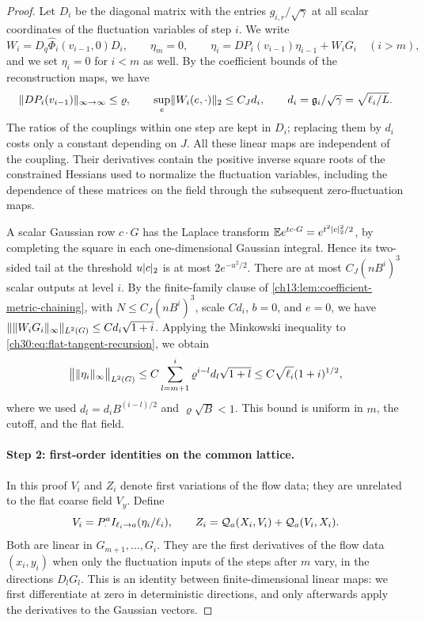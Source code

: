 \begin{proof}
Let $D_i$ be the diagonal matrix with the entries $g_{i,r}/\sqrt\gamma$ at all scalar coordinates of the fluctuation variables of step $i$. We write
\begin{equation}\label{ch30:eq:flat-tangent-recursion}
 W_i=D_q\widehat\Phi_i(v_{i-1},0)D_i,\qquad\eta_m=0,\qquad\eta_i=DP_i(v_{i-1})\eta_{i-1}+W_iG_i\quad(i>m),
\end{equation}
and we set $\eta_i=0$ for $i<m$ as well. By the coefficient bounds of the reconstruction maps, we have
\[
 \lVert DP_i(v_{i-1})\rVert_{\infty\to\infty}\le\varrho,\qquad\sup_e\lVert W_i(e,\cdot)\rVert_2\le C_Jd_i,\qquad d_i=\mathfrak g_i/\sqrt\gamma=\sqrt{\ell_i/L}.
\]
The ratios of the couplings within one step are kept in $D_i$; replacing them by $d_i$ costs only a constant depending on $J$. All these linear maps are independent of the coupling. Their derivatives contain the positive inverse square roots of the constrained Hessians used to normalize the fluctuation variables, including the dependence of these matrices on the field through the subsequent zero-fluctuation maps.

A scalar Gaussian row $c\cdot G$ has the Laplace transform $\mathbb E e^{tc\cdot G}=e^{t^2\lvert c\rvert_2^2/2}$, by completing the square in each one-dimensional Gaussian integral. Hence its two-sided tail at the threshold $u\lvert c\rvert_2$ is at most $2e^{-u^2/2}$. There are at most $C_J(nB^i)^3$ scalar outputs at level $i$. By the finite-family clause of \cref{ch13:lem:coefficient-metric-chaining}, with $N\le C_J(nB^i)^3$, scale $Cd_i$, $b=0$, and $e=0$, we have $\lVert \lVert W_iG_i\rVert_\infty\rVert_{L^2(G)}\le Cd_i\sqrt{1+i}$. Applying the Minkowski inequality to \eqref{ch30:eq:flat-tangent-recursion}, we obtain
\begin{equation}\label{ch30:eq:flat-linear-field}
 \bigl\lVert\lVert \eta_i\rVert_\infty\bigr\rVert_{L^2(G)}\le C\sum_{l=m+1}^i\varrho^{i-l}d_l\sqrt{1+l}\le C\sqrt{\ell_i}(1+i)^{1/2},
\end{equation}
where we used $d_l=d_iB^{(i-l)/2}$ and $\varrho\sqrt B<1$. This bound is uniform in $m$, the cutoff, and the flat field.

\paragraph{Step 2: first-order identities on the common lattice.} In this proof $V_i$ and $Z_i$ denote first variations of the flow data; they are unrelated to the flat coarse field $V_y$. Define
\begin{equation}\label{ch30:eq:linear-enhanced-pair}
 V_i=P_\cdot^aI_{\ell_i\to a}(\eta_i/\ell_i),\qquad Z_i=\mathcal Q_{a}(X_i,V_i)+\mathcal Q_{a}(V_i,X_i).
\end{equation}
Both are linear in $G_{m+1},\ldots,G_i$. They are the first derivatives of the flow data $(x_i,y_i)$ when only the fluctuation inputs of the steps after $m$ vary, in the directions $D_lG_l$. This is an identity between finite-dimensional linear maps: we first differentiate at zero in deterministic directions, and only afterwards apply the derivatives to the Gaussian vectors.


\end{proof}
